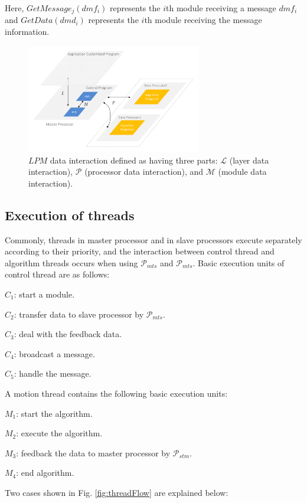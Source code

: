 \documentclass[journal,UTF8]{IEEEtran}
\begin{document}
Here, $GetMessage_{j}(dmf_i)$ represents the $i$th module receiving a message $dmf_i$ and $GetData(dmd_i)$ represents the $i$th module receiving the message information.

 \begin{figure}
	\centering
	\includegraphics[width=3in]{fig/Interaction.pdf}
	\caption{ $LPM$ data interaction defined as having three parts: $\mathcal{L}$ (layer data interaction), $\mathcal{P}$ (processor data interaction), and $\mathcal{M}$ (module data interaction).}
	\label{fig:Interaction}
\end{figure}

 \subsection{Execution of threads}
Commonly, threads in master processor and in slave processors execute separately according to their priority, and the interaction between control thread and algorithm threads occurs when using $\mathcal{P}_{mts}$ and $\mathcal{P}_{mts}$. Basic execution units of control thread are as follows:
 
 \textbf{$C_{1}$}: start a module.
 
 \textbf{$C_{2}$}: transfer data to slave processor by $\mathcal{P}_{mts}$.
 
 \textbf{$C_{3}$}: deal with the feedback data.
 
 \textbf{$C_{4}$}: broadcast a message.
 
  \textbf{$C_{5}$}: handle the message.
  
 A motion thread contains the following basic execution units:
 
 \textbf{$M_{1}$}: start the algorithm.
 
 \textbf{$M_{2}$}: execute the algorithm.
 
 \textbf{$M_{3}$}: feedback the data to master processor by $\mathcal{P}_{stm}$.
 
 \textbf{$M_{4}$}: end algorithm.
  
Two cases shown in Fig. \ref{fig:threadFlow} are explained below:
  
\end{document}
